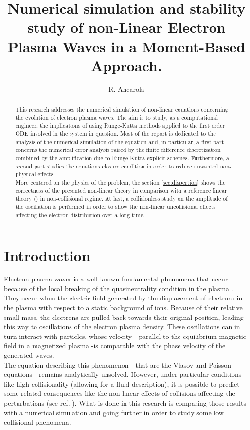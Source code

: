 \documentclass[final]{jpp}
\title{Numerical simulation and stability study of non-Linear Electron Plasma Waves in a Moment-Based Approach.}
\author{R. Ancarola \aff{1}
  \corresp{\email{raffaele.ancarola@epfl.ch}}}
\affiliation{\aff{1} \'Ecole Polytechnique F\'ed\'erale de Lausanne (EPFL),
  Swiss Plasma Center,
CH-1015 Lausanne, Switzerland}
\begin{document}
\maketitle

\begin{abstract}
This research addresses the numerical simulation of non-linear equations concerning the evolution of electron plasma waves. 
The aim is to study, as a computational engineer,  the implications of using Runge-Kutta methods applied to the first order ODE involved in the system in question.
Most of the report is dedicated to the analysis of the numerical simulation of the equation and, in particular,
a first part concerns the numerical error analysis raised by the finite difference discretization combined by the amplification due to Runge-Kutta explicit schemes. 
Furthermore, a second part studies the equations closure condition in order to reduce unwanted non-physical effects.
\\
More centered on the physics of the problem, the section \ref{sec:dispertion} shows the correctness of the presented non-linear theory in comparison with a reference linear theory (\cite{linear}) in non-collisional regime. At last, a collisionless study on the amplitude of the oscillation is performed in order to show the non-linear uncollisional effects affecting the electron distribution over a long time. 
\end{abstract}

\tableofcontents

\section{Introduction} 

Electron plasma waves is a well-known fundamental phenomena that occur because of the local breaking of the quasineutrality condition in the plasma \cite{thesis5638, Jorge2017}. They occur when the electric field generated by the displacement of electrons in the plasma with respect to a static background of ions. Because of their relative small mass, the electrons are pulled back towards their original position, leading this way to oscillations of the electron plasma density. These oscillations can in turn interact with particles, whose velocity - parallel to the equilibrium magnetic field in a magnetized plasma -is comparable with the phase velocity of the generated waves.
\\
The equation describing this phenomenon - that are the Vlasov and Poisson equations - remains analytically unsolved. However, under particular conditions like high collisionality (allowing for a fluid description), it is possible to predict some related consequences like the non-linear effects of collisions affecting the perturbations (see ref. \cite{thesis5638}). What is done in this research is comparing those results with a numerical simulation and going further in order to study some low collisional phenomena.
\end{document}
